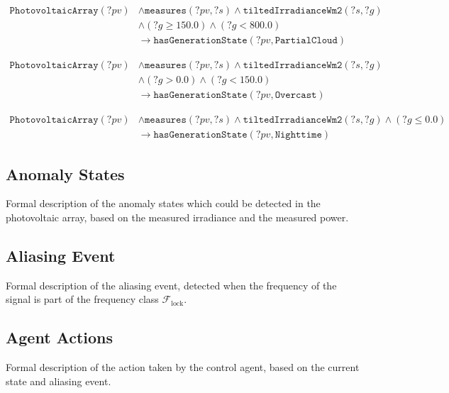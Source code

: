 \begin{equation}
\begin{aligned}
\texttt{PhotovoltaicArray}(?pv) &\wedge \texttt{measures}(?pv, ?s) \wedge \texttt{tiltedIrradianceWm2}(?s, ?g) \\
&\wedge (?g \ge 150.0) \wedge (?g < 800.0) \\
&\longrightarrow \texttt{hasGenerationState}(?pv, \texttt{PartialCloud})
\end{aligned}
\end{equation}


\begin{equation}
\begin{aligned}
\texttt{PhotovoltaicArray}(?pv) &\wedge \texttt{measures}(?pv, ?s) \wedge \texttt{tiltedIrradianceWm2}(?s, ?g) \\
&\wedge (?g > 0.0) \wedge (?g < 150.0) \\
&\longrightarrow \texttt{hasGenerationState}(?pv, \texttt{Overcast})
\end{aligned}
\end{equation}


\begin{equation}
\begin{aligned}
\texttt{PhotovoltaicArray}(?pv) &\wedge \texttt{measures}(?pv, ?s) \wedge \texttt{tiltedIrradianceWm2}(?s, ?g) \wedge (?g \le 0.0) \\
&\longrightarrow \texttt{hasGenerationState}(?pv, \texttt{Nighttime})
\end{aligned}
\end{equation}

\subsection{Anomaly States}
Formal description of the anomaly states which could be detected in the photovoltaic array, based on the measured irradiance and the measured power.

\subsection{Aliasing Event} 
Formal description of the aliasing event, detected when the frequency of the signal is part of the frequency class $\mathcal{F}_{\mathrm{lock}}$.

\subsection{Agent Actions}
Formal description of the action taken by the control agent, based on the current state and aliasing event.